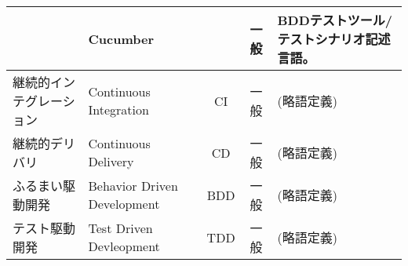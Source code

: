 \begin{longtable}{p{8em}|p{8em}|c|c|p{16em}}
  & Cucumber & & 一般 & BDDテストツール/テストシナリオ記述言語。 \\ \hline
  継続的インテグレーション & Continuous Integration & CI & 一般 & (略語定義) \\ \hline
  継続的デリバリ & Continuous Delivery & CD & 一般 & (略語定義) \\ \hline
  ふるまい駆動開発 & Behavior Driven Development & BDD & 一般 & (略語定義) \\ \hline
  テスト駆動開発 & Test Driven Devleopment & TDD & 一般 & (略語定義) \\ \hline
 \end{longtable}

